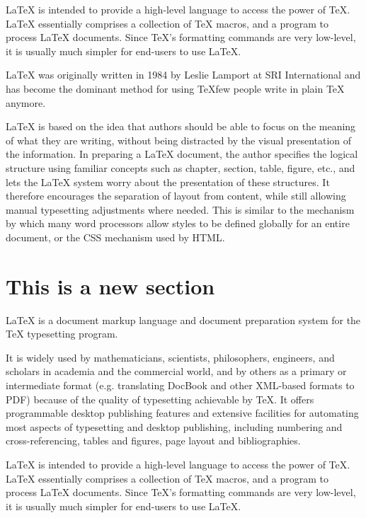 \documentclass[12pt]{ucthesis}
\begin{document}
LaTeX is intended to provide a high-level language to access the power of TeX. LaTeX essentially comprises a collection of TeX macros, and a program to process LaTeX documents. Since TeX's formatting commands are very low-level, it is usually much simpler for end-users to use LaTeX.

LaTeX was originally written in 1984 by Leslie Lamport at SRI International and has become the dominant method for using TeXfew people write in plain TeX anymore.

LaTeX is based on the idea that authors should be able to focus on the meaning of what they are writing, without being distracted by the visual presentation of the information. In preparing a LaTeX document, the author specifies the logical structure using familiar concepts such as chapter, section, table, figure, etc., and lets the LaTeX system worry about the presentation of these structures. It therefore encourages the separation of layout from content, while still allowing manual typesetting adjustments where needed. This is similar to the mechanism by which many word processors allow styles to be defined globally for an entire document, or the CSS mechanism used by HTML.

\section{This is a new section}
\label{a-new-section}

LaTeX is a document markup language and document preparation system for the TeX typesetting program.

It is widely used by mathematicians, scientists, philosophers, engineers, and scholars in academia and the commercial world, and by others as a primary or intermediate format (e.g. translating DocBook and other XML-based formats to PDF) because of the quality of typesetting achievable by TeX. It offers programmable desktop publishing features and extensive facilities for automating most aspects of typesetting and desktop publishing, including numbering and cross-referencing, tables and figures, page layout and bibliographies.

LaTeX is intended to provide a high-level language to access the power of TeX. LaTeX essentially comprises a collection of TeX macros, and a program to process LaTeX documents. Since TeX's formatting commands are very low-level, it is usually much simpler for end-users to use LaTeX.
\end{document}
